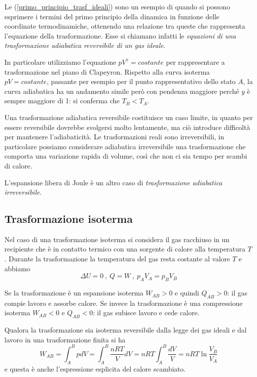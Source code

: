 \documentclass[class=book, crop=false, oneside, 12pt]{standalone}
\begin{document}
Le (\ref{primo_principio_trasf_ideali}) sono un esempio di quando si possono esprimere i termini del primo principio della dinamica in funzione delle coordinate termodinamiche, ottenendo una relazione tra queste che rappresenta l'equazione della trasformazione.
Esse si chiamano infatti le \emph{equazioni di una trasformazione adiabatica reversibile di un gas ideale}.

In particolare utilizziamo l'equazione \(p V^{\gamma} = costante\) per rappresentare a trasformazione nel piano di Clapeyron. 
Rispetto alla curva isoterma \(p V = costante\), passante per esempio per il punto rappresentativo dello stato \(A\), la curva adiabatica ha un andamento simile però con pendenza maggiore perché \(y\) è sempre maggiore di 1:  si conferma che \(T_B < T_A\).

Una trasformazione adiabatica reversibile costituisce un caso limite, in quanto per essere reversibile dovrebbe svolgersi molto lentamente, ma ciò introduce difficoltà per mantenere l'adiabaticità. 
Le trasformazioni reali sono irreversibili, in particolare possiamo considerare adiabatica irreversibile una trasformazione che comporta una variazione rapida di volume, così che non ci sia tempo per scambi di calore. 

L'espansione libera di Joule è un altro caso di \emph{trasformazione adiabatica irreversibile}.

\subsection{Trasformazione isoterma}

Nel caso di una trasformazione isoterma si considera il gas racchiuso in un recipiente che è in contatto termico con una sorgente di calore alla temperatura \(T\). 
Durante la trasformazione la temperatura del gas resta costante al valore \(T\) e abbiamo
\begin{equation*}
    \Delta U = 0 \ , \ Q = W \ , \ p_A V_A = p_B V_B
\end{equation*}

Se la trasformazione è un espansione isoterma \(W_{AB}>0\) e quindi \(Q_{AB}>0\): il gas compie lavoro e assorbe calore. 
Se invece la trasformazione è una compressione isoterma \(W_{AB} < 0 \) e \(Q_{AB} < 0\): il gas subisce lavoro e cede calore.

Qualora la trasformazione sia isoterma reversibile dalla legge dei gas ideali e dal lavoro in una trasformazione finita si ha
\begin{equation}
    W_{AB} = \int_A^B p d V = \int_A^B \frac{n R T}{V} d V = n R T \int_A^B \frac{d V}{V} = n R T \ln \frac{V_{B}}{V_{A}} 
\end{equation}
e questa è anche l'espressione esplicita del calore scambiato.
\end{document}
